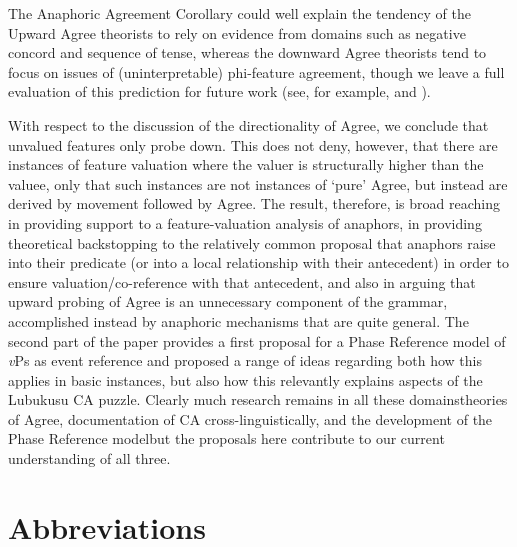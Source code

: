 The Anaphoric Agreement Corollary could well explain the tendency of the Upward Agree theorists to rely on evidence from domains such as negative concord and sequence of tense, whereas the downward Agree theorists tend to focus on issues of (uninterpretable) phi-feature agreement, though we leave a full evaluation of this prediction for future work (see, for example, \citealt{Bjorkman:toappearb} and \citealt{Preminger:2013}). 

With respect to the discussion of the directionality of Agree, we conclude that unvalued features only probe down.  This does not deny, however, that there are instances of feature valuation where the valuer is structurally higher than the valuee, only that such instances are not instances of `pure' Agree, but instead are derived by movement followed by Agree. The result, therefore, is broad reaching in providing support to a feature-valuation analysis of anaphors, in providing theoretical backstopping to the relatively common proposal that anaphors raise into their predicate (or into a local relationship with their antecedent) in order to ensure valuation/co-reference with that antecedent, and also in arguing that upward probing of Agree is an unnecessary component of the grammar, accomplished instead by anaphoric mechanisms that are quite general. The second part of the paper provides a first proposal for a Phase Reference model of \textit{v}Ps as event reference and proposed a range of ideas regarding both how this applies in basic instances, but also how this relevantly explains aspects of the Lubukusu CA puzzle. Clearly much research remains in all these domains\textemdash theories of Agree, documentation of CA cross-linguistically, and the development of the Phase Reference model\textemdash but the proposals here contribute to our current understanding of all three. 

\section*{Abbreviations}

